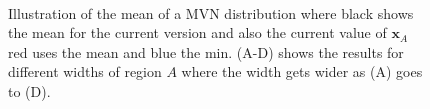 \documentclass[oneside, 12 pt]{book}
\begin{document}
   \begin{figure}[t!]
   \begin{center} 
      \\
    \end{center}     
    \caption{Illustration of the mean of a MVN distribution where black shows the mean for the current version and also the current value of $\mathbf{x}_A$ red uses the mean and blue the min. (A-D) shows the results for different widths of region $A$ where the width gets wider as (A) goes to (D).}
    \label{fig:varyf}
    \hrulefill
    \end{figure}
    
\end{document}
